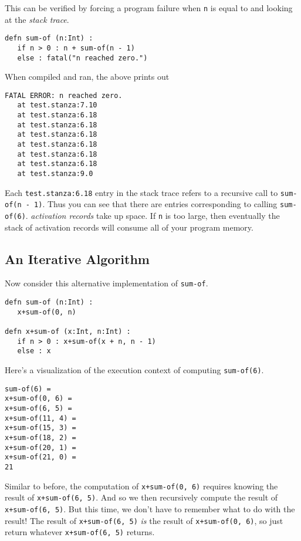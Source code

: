 \documentclass[10pt,oneside]{book}
\begin{document}
This can be verified by forcing a program failure when \texttt{\frenchspacing n} is equal to \texttt{} and looking at the {\em stack trace}.
\begin{lstlisting}
defn sum-of (n:Int) :
   if n > 0 : n + sum-of(n - 1)
   else : fatal("n reached zero.")
\end{lstlisting}
When compiled and ran, the above prints out
\begin{lstlisting}
FATAL ERROR: n reached zero.
   at test.stanza:7.10
   at test.stanza:6.18
   at test.stanza:6.18
   at test.stanza:6.18
   at test.stanza:6.18
   at test.stanza:6.18
   at test.stanza:6.18
   at test.stanza:9.0
\end{lstlisting}
Each \texttt{\frenchspacing test.stanza:6.18} entry in the stack trace refers to a recursive call to \texttt{\frenchspacing sum-of(n - 1)}. Thus you can see that there are \texttt{} entries corresponding to calling \texttt{\frenchspacing sum-of(6)}. {\em activation records} take up space. If \texttt{\frenchspacing n} is too large, then eventually the stack of activation records will consume all of your program memory.

\subsection*{An Iterative Algorithm}
Now consider this alternative implementation of \texttt{\frenchspacing sum-of}.
\begin{lstlisting}
defn sum-of (n:Int) :
   x+sum-of(0, n)
   
defn x+sum-of (x:Int, n:Int) :
   if n > 0 : x+sum-of(x + n, n - 1)
   else : x  
\end{lstlisting}

Here's a visualization of the execution context of computing \texttt{\frenchspacing sum-of(6)}.
\begin{lstlisting}
sum-of(6) =
x+sum-of(0, 6) =
x+sum-of(6, 5) =
x+sum-of(11, 4) =
x+sum-of(15, 3) =
x+sum-of(18, 2) =
x+sum-of(20, 1) =
x+sum-of(21, 0) =
21
\end{lstlisting}
Similar to before, the computation of \texttt{\frenchspacing x+sum-of(0, 6)} requires knowing the result of \texttt{\frenchspacing x+sum-of(6, 5)}. And so we then recursively compute the result of \texttt{\frenchspacing x+sum-of(6, 5)}. But this time, we don't have to remember what to do with the result! The result of \texttt{\frenchspacing x+sum-of(6, 5)} {\em is} the result of \texttt{\frenchspacing x+sum-of(0, 6)}, so just return whatever \texttt{\frenchspacing x+sum-of(6, 5)} returns. 
\end{document}

